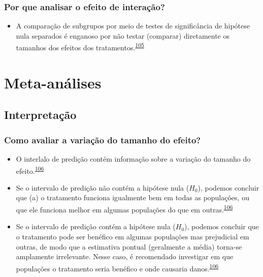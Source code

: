\documentclass[
]{book}
\providecommand{\tightlist}{%
  \setlength{\itemsep}{0pt}\setlength{\parskip}{0pt}}
\begin{document}
\hypertarget{por-que-analisar-o-efeito-de-interauxe7uxe3o}{%
\subsection{Por que analisar o efeito de interação?}\label{por-que-analisar-o-efeito-de-interauxe7uxe3o}}

\begin{itemize}
\tightlist
\item
  A comparação de subgrupos por meio de testes de significância de hipótese nula separados é enganoso por não testar (comparar) diretamente os tamanhos dos efeitos dos tratamentos.\textsuperscript{\protect\hyperlink{ref-Matthews1996}{105}}
\end{itemize}

\hypertarget{meta-analises}{%
\chapter{\texorpdfstring{\textbf{Meta-análises}}{Meta-análises}}\label{meta-analises}}

\hypertarget{interpretacao}{%
\section{Interpretação}\label{interpretacao}}

\hypertarget{como-avaliar-a-variauxe7uxe3o-do-tamanho-do-efeito}{%
\subsection{Como avaliar a variação do tamanho do efeito?}\label{como-avaliar-a-variauxe7uxe3o-do-tamanho-do-efeito}}

\begin{itemize}
\item
  O interlalo de predição contém informação sobre a variação do tamanho do efeito.\textsuperscript{\protect\hyperlink{ref-Borenstein2022}{106}}
\item
  Se o intervalo de predição não contém a hipótese nula (\(H_{0}\)), podemos concluir que (a) o tratamento funciona igualmente bem em todas as populações, ou que ele funciona melhor em algumas populações do que em outras.\textsuperscript{\protect\hyperlink{ref-Borenstein2022}{106}}
\item
  Se o intervalo de predição contém a hipótese nula (\(H_{0}\)), podemos concluir que o tratamento pode ser benéfico em algumas populações mas prejudicial em outras, de modo que a estimativa pontual (geralmente a média) torna-se amplamente irrelevante. Nesse caso, é recomendado investigar em que populações o tratamento seria benéfico e onde causaria danos.\textsuperscript{\protect\hyperlink{ref-Borenstein2022}{106}}
\end{itemize}
\end{document}
